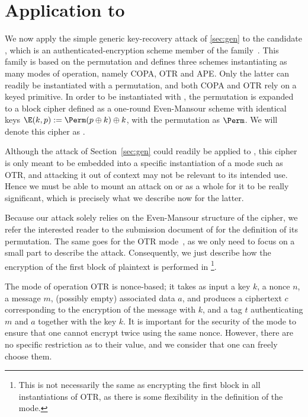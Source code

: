 \section{Application to \proestotr}
\label{sec:appli}

We now apply the simple generic key-recovery attack of \autoref{sec:gen} to the \caesar candidate \proestotr, which is an authenticated-encryption
scheme member of the \proest family~\cite{proest}. This family is based on the \proest permutation and defines
three schemes instantiating as many modes of operation, namely COPA, OTR and APE. Only
the latter can readily be instantiated with a permutation, and both COPA and OTR rely on a keyed primitive. In order
to be instantiated with \proest, the permutation is expanded to a block cipher
defined as a one-round Even-Mansour scheme with identical keys
$\E(k,p) := \Perm(p \oplus k) \oplus k$,
with the \proest permutation as $\Perm$. We will denote this cipher as \proestem.

Although the attack of Section~\ref{sec:gen} could readily be applied to \proestem, this cipher is only
meant to be embedded into a specific instantiation of a mode such as OTR, and attacking it out of context may not
be relevant to its intended use.
Hence we must
be able to mount an attack on \proestcopa or \proestotr as a whole for it to be really significant,
which is precisely what we describe now for the latter.

Because our attack solely relies on the Even-Mansour structure of the cipher, we refer the interested reader to the
submission document of \proest for the definition of its permutation.
The same goes for the OTR mode~\cite{M14}, as we only need to focus on a small part to describe the attack.
Consequently, we just describe how the encryption of the first block of plaintext is performed in \proestotr\footnote{This is not necessarily the
same as encrypting the first block in all instantiations of OTR, as there is some flexibility in the definition of the mode.}.

\medskip

The mode of operation OTR is nonce-based; it takes as input a key $k$, a nonce $n$, a message $m$,
(possibly empty) associated data $a$, and produces a ciphertext $c$ corresponding
to the encryption of the message with $k$, and a tag $t$ authenticating $m$ and
$a$ together with the key $k$. It is important for the security of the mode to ensure
that one cannot encrypt twice using the same nonce. However, there are no
specific restriction as to their value, and we consider that one
can freely choose them.

